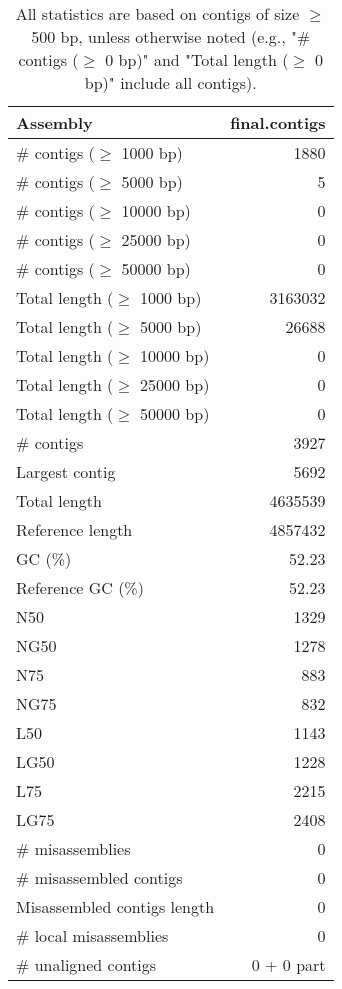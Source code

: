 \documentclass[12pt,a4paper]{article}
\begin{document}
\begin{table}[ht]
\begin{center}
\caption{All statistics are based on contigs of size $\geq$ 500 bp, unless otherwise noted (e.g., "\# contigs ($\geq$ 0 bp)" and "Total length ($\geq$ 0 bp)" include all contigs).}
\begin{tabular}{|l*{1}{|r}|}
\hline
Assembly & final.contigs \\ \hline
\# contigs ($\geq$ 1000 bp) & 1880 \\ \hline
\# contigs ($\geq$ 5000 bp) & 5 \\ \hline
\# contigs ($\geq$ 10000 bp) & 0 \\ \hline
\# contigs ($\geq$ 25000 bp) & 0 \\ \hline
\# contigs ($\geq$ 50000 bp) & 0 \\ \hline
Total length ($\geq$ 1000 bp) & 3163032 \\ \hline
Total length ($\geq$ 5000 bp) & 26688 \\ \hline
Total length ($\geq$ 10000 bp) & 0 \\ \hline
Total length ($\geq$ 25000 bp) & 0 \\ \hline
Total length ($\geq$ 50000 bp) & 0 \\ \hline
\# contigs & 3927 \\ \hline
Largest contig & 5692 \\ \hline
Total length & 4635539 \\ \hline
Reference length & 4857432 \\ \hline
GC (\%) & 52.23 \\ \hline
Reference GC (\%) & 52.23 \\ \hline
N50 & 1329 \\ \hline
NG50 & 1278 \\ \hline
N75 & 883 \\ \hline
NG75 & 832 \\ \hline
L50 & 1143 \\ \hline
LG50 & 1228 \\ \hline
L75 & 2215 \\ \hline
LG75 & 2408 \\ \hline
\# misassemblies & 0 \\ \hline
\# misassembled contigs & 0 \\ \hline
Misassembled contigs length & 0 \\ \hline
\# local misassemblies & 0 \\ \hline
\# unaligned contigs & 0 + 0 part \\ \hline

\end{tabular}
\end{center}
\end{table}
\end{document}
